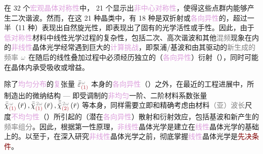 在 32 个\textcolor{Plum}{宏观晶体对称性}中， 21 个显示出\textcolor{Plum}{非中心对称性}，使得这些\textcolor{NavyBlue}{点群}内能够产生二次谐波。然而，在这 21 种\textcolor{NavyBlue}{晶类}中，有 18 种是\textcolor{NavyBlue}{双折射}或\textcolor{Plum}{各向异性}的，超过一半（11 种）表现出自然\textcolor{NavyBlue}{旋光}性，即表现出了固有的\textcolor{NavyBlue}{光学活性}或\textcolor{NavyBlue}{手性}\cite{ossikovskiConstitutiveRelationsOptically2021}。因此，由于\textcolor{Plum}{低对称性}材料中\textcolor{PineGreen}{线性光学}过程的复杂性，包括二次、高次谐波和其他\textcolor{gray}{混频}现象在内的\textcolor{Plum}{非线性}\textcolor{PineGreen}{晶体光学}经常遇到巨大的\textcolor{Plum}{计算挑战}\cite{robertsSimplifiedCharacterizationUniaxial1992,dmitrievEffectiveNonlinearityCoefficients1993,diesperovEffectiveNonlinearCoefficient1997}，即\textcolor{NavyBlue}{泵浦}/\textcolor{PineGreen}{基波}和由其驱动的\textcolor{gray}{新生成的频率} $\mathcolor{gray}{\omega}$ 在随后的\textcolor{PineGreen}{线性叠加}过程中必须经历独立的（\textcolor{Plum}{各向异性}）衍射（），同时可能在晶体内承受\textcolor{NavyBlue}{吸收}或\textcolor{NavyBlue}{增益}\cite{shengNonlinearopticalCalculationsUsing1980,grundmannOpticallyAnisotropicMedia2017}。

除了\textcolor{Plum}{均匀分布}的\textcolor{Plum}{复}张量 $\bar{\bar{\varepsilon}}^{\;\! \mathcolor{gray}{\omega}}_{\textcolor{Maroon}{(1)}}$ 本身的\textcolor{Plum}{各向异性}（）之外，在最近的工程进展中，所制造出的微纳结构 --- 即受调制的\textcolor{Plum}{非均匀}一阶、二阶材料系数张量 $\bar{\bar{\chi}}^{\;\! \mathcolor{gray}{\omega}}_{ \textcolor{Maroon}{(1)}} \left( \bar{r} \right),\bar{\bar{\chi}}^{\;\! \mathcolor{gray}{2\omega}}_{ \textcolor{Maroon}{(1)}} \left( \bar{r} \right),\bar{\bar{\bar{\chi}}}^{\;\! \mathcolor{gray}{2\omega}}_{ \textcolor{Maroon}{(2)}} \left( \bar{r} \right)$ 等本身\cite{xuFemtosecondLaserWriting2022,weiExperimentalDemonstrationThreedimensional2018,xuThreedimensionalNonlinearPhotonic2018,keren-zurNewDimensionNonlinear2018}，同样需要立即和精确考虑由材料\textcolor{gray}{（亚）波长}尺度\textcolor{Plum}{不均匀性}（）所引起的（潜在\textcolor{Plum}{各向异性}）散射和衍射效应\cite{chenQuasiphasematchingdivisionMultiplexingHolography2021b,chenLaserNanoprinting3D2023,sunFerroelectricTopologiesBaTiO32025,xuLargeFieldofviewNonlinear2024}，包括\textcolor{PineGreen}{基波}和新产生的\textcolor{gray}{频率组分}\cite{chenQuasiphasematchingdivisionMultiplexingHolography2021b,chenLaserNanoprinting3D2023}。因此，根据\textcolor{NavyBlue}{第一性原理}，\textcolor{Plum}{非线性}\textcolor{PineGreen}{晶体光学}是建立在\textcolor{Plum}{线性}\textcolor{PineGreen}{晶体光学}的基础上的。以至于，在深入研究\textcolor{Plum}{非线性}\textcolor{PineGreen}{晶体光学}之前，彻底掌握\textcolor{Plum}{线性}\textcolor{PineGreen}{晶体光学}是\textcolor{Maroon}{先决条件}。

